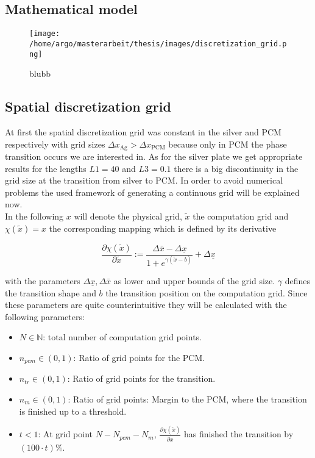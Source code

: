 \documentclass{scrartcl}[12pt, halfparskip]
\begin{document}
\subsection{Mathematical model}

\begin{figure}[H]
	\centering
	\texttt{[image: /home/argo/masterarbeit/thesis/images/discretization\_grid.png]}
	\caption{blubb}
\end{figure}

\subsection{Spatial discretization grid}
At first the spatial discretization grid was constant in the silver and PCM respectively with grid sizes $\Delta x_{\text{Ag}} > \Delta x_{\text{PCM}}$ because only in PCM the phase transition occurs we are interested in. As for the silver plate we get appropriate results for the lengths $L1=40$ and $L3=0.1$ there is a big discontinuity in the grid size at the transition from silver to PCM. In order to avoid numerical problems the used framework of generating a continuous grid will be explained now. \\
In the following $x$ will denote the physical grid, $\tilde{x}$ the computation grid and $\chi(\tilde{x}) = x$ the corresponding mapping which is defined by its derivative

\begin{equation}
	\frac{\partial \chi(\tilde{x})}{\partial \tilde{x}} := \frac{\Delta \bar{x} - \Delta \underline{x}}{1 + e^{\gamma(\tilde{x} - b)}} + \Delta \underline{x}
\end{equation}

with the parameters $\Delta \underline{x}, \Delta \bar{x}$ as lower and upper bounds of the grid size. $\gamma$ defines the transition shape and $b$ the transition position on the computation grid. Since these parameters are quite counterintuitive they will be calculated with the following parameters:

\begin{itemize}
	\item $N \in \mathbb{N}$: total number of computation grid points.
	\item $n_{pcm} \in (0,1)$: Ratio of grid points for the PCM.
	\item $n_{tr} \in (0,1)$: Ratio of grid points for the transition.
	\item $n_{m} \in (0,1)$: Ratio of grid points: Margin to the PCM, where the transition is finished up to a threshold.
	\item $t < 1$: At grid point $N-N_{pcm}-N_m$, $\frac{\partial \chi(\tilde{x})}{\partial \tilde{x}}$ has finished the transition by $(100 \cdot t)\%$.
\end{itemize}
\end{document}
